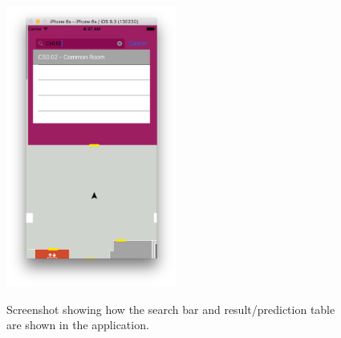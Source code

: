\documentclass[main.tex]{subfiles}
\begin{document}
\begin{figure}[H]
\centering
\includegraphics[width=0.5\textwidth]{images-implementation/IOSRoomSearchInApp.png}
\label{IOSRoomSearchInApp}
\caption{Screenshot showing how the search bar and result/prediction table are shown in the application.}
\end{figure}


 
\end{document}
